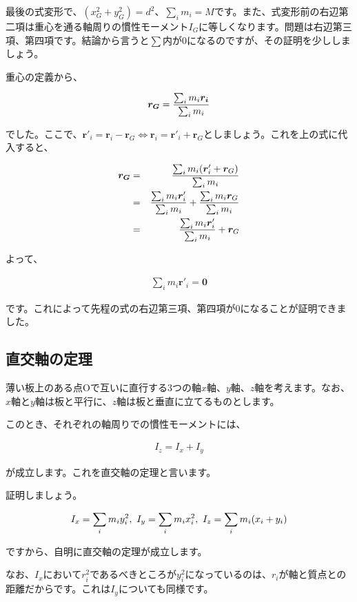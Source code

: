 最後の式変形で、$(x_G^2+y_G^2)=d^2$、$\sum_i m_i=M$です。また、式変形前の右辺第二項は重心を通る軸周りの慣性モーメント$I_G$に等しくなります。問題は右辺第三項、第四項です。結論から言うと$\sum$内が$0$になるのですが、その証明を少ししましょう。

重心の定義から、

\begin{eqnarray}
    \bm{r_G}=\frac{\sum_i m_i\bm{r_i}}{\sum_i m_i} \notag
\end{eqnarray}

でした。ここで、$\bm{r}'_i=\bm{r}_i-\bm{r}_G\Leftrightarrow\bm{r}_i=\bm{r}'_i+\bm{r}_G$としましょう。これを上の式に代入すると、

\begin{eqnarray}
    \bm{r_G}&=&\frac{\sum_i m_i(\bm{r}'_i+\bm{r}_G)}{\sum_i m_i} \notag \\
    &=&\frac{\sum_i m_i\bm{r}'_i}{\sum_i m_i}+\frac{\sum_i m_i\bm{r}_G}{\sum_i m_i} \notag \\
    &=&\frac{\sum_i m_i\bm{r}'_i}{\sum_i m_i}+\bm{r}_G \notag
\end{eqnarray}

よって、

\begin{eqnarray}
    \sum_i m_i\bm{r}'_i=\bm{0}
\end{eqnarray}

です。これによって先程の式の右辺第三項、第四項が0になることが証明できました。



\subsection{直交軸の定理}
薄い板上のある点Oで互いに直行する3つの軸$x軸、y軸、z軸$を考えます。なお、$x$軸と$y$軸は板と平行に、$z$軸は板と垂直に立てるものとします。

このとき、それぞれの軸周りでの慣性モーメントには、

\begin{eqnarray}
    I_z=I_x+I_y
\end{eqnarray}

が成立します。これを直交軸の定理と言います。

証明しましょう。

\begin{eqnarray}
    I_x=\sum_i m_i y_i^2,\ I_y=\sum_i m_i x_i^2,\ I_z=\sum_i m_i(x_i+y_i) \notag
\end{eqnarray}

ですから、自明に直交軸の定理が成立します。

なお、$I_x$において$r_i^2$であるべきところが$y_i^2$になっているのは、$r_i$が軸と質点との距離だからです。これは$I_y$についても同様です。




